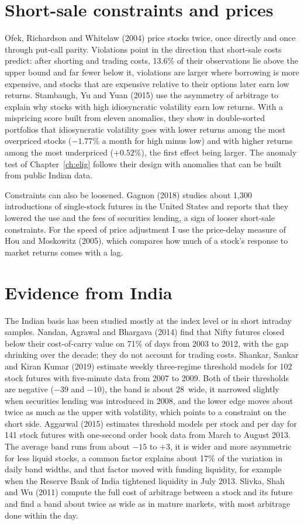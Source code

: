 \section{Short-sale constraints and prices}
Ofek, Richardson and Whitelaw (2004) price stocks twice, once directly and once through put-call parity. Violations point
in the direction that short-sale costs predict: after shorting and trading costs, 13.6\% of their observations lie above
the upper bound and far fewer below it, violations are larger where borrowing is more expensive, and stocks that are expensive
relative to their options later earn low returns. Stambaugh, Yu and Yuan (2015) use the asymmetry of arbitrage to explain why
stocks with high idiosyncratic volatility earn low returns. With a mispricing score built from eleven anomalies, they show
in double-sorted portfolios that idiosyncratic volatility goes with lower returns among the most overpriced stocks
($-1.77\%$ a month for high minus low) and with higher returns among the most underpriced ($+0.52\%$), the first effect
being larger. The anomaly test of Chapter~\ref{ch:elig} follows their design with anomalies that can be built from public
Indian data.

Constraints can also be loosened. Gagnon (2018) studies about 1,300 introductions of single-stock futures in the United States and reports
that they lowered the use and the fees of securities lending, a sign of looser short-sale constraints. For the speed of price adjustment I use the price-delay measure of Hou and
Moskowitz (2005), which compares how much of a stock's response to market returns comes with a lag.

\section{Evidence from India}
The Indian basis has been studied mostly at the index level or in short intraday samples. Nandan, Agrawal and Bhargava
(2014) find that Nifty futures closed below their cost-of-carry value on 71\% of days from 2003 to 2012, with the gap
shrinking over the decade; they do not account for trading costs. Shankar, Sankar and Kiran Kumar (2019) estimate weekly
three-regime threshold models for 102 stock futures with five-minute data from 2007 to 2009. Both of their thresholds are
negative ($-39$ and $-10$\bp), the band is about 28\bp\ wide, it narrowed slightly when securities lending was introduced
in 2008, and the lower edge moves about twice as much as the upper with volatility, which points to a constraint on the
short side. Aggarwal (2015) estimates threshold models per stock and per day for 141 stock futures with one-second order
book data from March to August 2013. The average band runs from about $-15$ to $+3$\bp, it is wider and more asymmetric for
less liquid stocks, a common factor explains about 17\% of the variation in daily band widths, and that factor moved with
funding liquidity, for example when the Reserve Bank of India tightened liquidity in July 2013. Slivka, Shah and Wu (2011)
compute the full cost of arbitrage between a stock and its future and find a band about twice as wide as in mature
markets, with most arbitrage done within the day.

